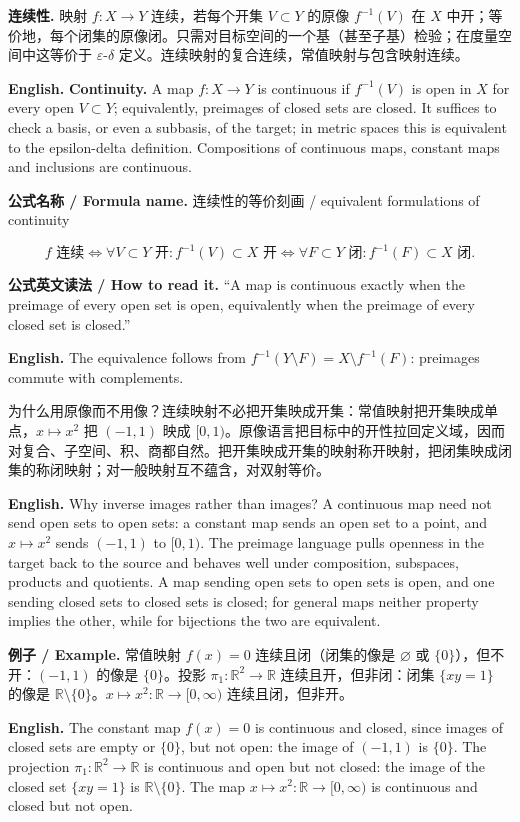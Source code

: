 \documentclass[UTF8,11pt,a4paper]{ctexart}
\newcommand{\EN}[1]{\par\noindent\textbf{English.} #1\par}
\newcommand{\READ}[1]{\par\noindent\textbf{公式英文读法 / How to read it.} #1\par}
\newcommand{\FORMULA}[2]{\par\noindent\textbf{公式名称 / Formula name.} #1 / #2\par}
\newcommand{\EX}[2]{\par\noindent\textbf{例子 / Example.} #1\par\EN{#2}}
\begin{document}
\noindent\textbf{连续性.} 映射 $f:X\to Y$ 连续，若每个开集 $V\subset Y$ 的原像 $f^{-1}(V)$ 在 $X$ 中开；等价地，每个闭集的原像闭。只需对目标空间的一个基（甚至子基）检验；在度量空间中这等价于 $\varepsilon$-$\delta$ 定义。连续映射的复合连续，常值映射与包含映射连续。
\EN{\textbf{Continuity.} A map $f:X\to Y$ is continuous if $f^{-1}(V)$ is open in $X$ for every open $V\subset Y$; equivalently, preimages of closed sets are closed. It suffices to check a basis, or even a subbasis, of the target; in metric spaces this is equivalent to the epsilon-delta definition. Compositions of continuous maps, constant maps and inclusions are continuous.}

\FORMULA{连续性的等价刻画}{equivalent formulations of continuity}
\[
f\text{ 连续}\iff
\forall V\subset Y\text{ 开}:f^{-1}(V)\subset X\text{ 开}
\iff
\forall F\subset Y\text{ 闭}:f^{-1}(F)\subset X\text{ 闭}.
\]
\READ{``A map is continuous exactly when the preimage of every open set is open, equivalently when the preimage of every closed set is closed.''}
\EN{The equivalence follows from $f^{-1}(Y\setminus F)=X\setminus f^{-1}(F)$: preimages commute with complements.}

\noindent 为什么用原像而不用像？连续映射不必把开集映成开集：常值映射把开集映成单点，$x\mapsto x^2$ 把 $(-1,1)$ 映成 $[0,1)$。原像语言把目标中的开性拉回定义域，因而对复合、子空间、积、商都自然。把开集映成开集的映射称开映射，把闭集映成闭集的称闭映射；对一般映射互不蕴含，对双射等价。
\EN{Why inverse images rather than images? A continuous map need not send open sets to open sets: a constant map sends an open set to a point, and $x\mapsto x^2$ sends $(-1,1)$ to $[0,1)$. The preimage language pulls openness in the target back to the source and behaves well under composition, subspaces, products and quotients. A map sending open sets to open sets is open, and one sending closed sets to closed sets is closed; for general maps neither property implies the other, while for bijections the two are equivalent.}

\EX{常值映射 $f(x)=0$ 连续且闭（闭集的像是 $\varnothing$ 或 $\{0\}$），但不开：$(-1,1)$ 的像是 $\{0\}$。投影 $\pi_1:\mathbb R^2\to\mathbb R$ 连续且开，但非闭：闭集 $\{xy=1\}$ 的像是 $\mathbb R\setminus\{0\}$。$x\mapsto x^2:\mathbb R\to[0,\infty)$ 连续且闭，但非开。}{The constant map $f(x)=0$ is continuous and closed, since images of closed sets are empty or $\{0\}$, but not open: the image of $(-1,1)$ is $\{0\}$. The projection $\pi_1:\mathbb R^2\to\mathbb R$ is continuous and open but not closed: the image of the closed set $\{xy=1\}$ is $\mathbb R\setminus\{0\}$. The map $x\mapsto x^2:\mathbb R\to[0,\infty)$ is continuous and closed but not open.}
\end{document}
